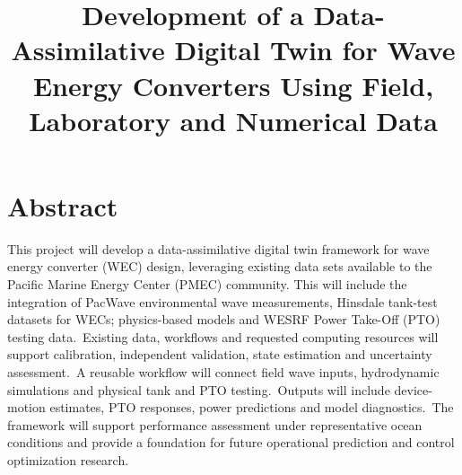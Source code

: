 \documentclass[11pt]{article}
\title{Development of a Data-Assimilative Digital Twin for Wave Energy Converters Using Field, Laboratory and Numerical Data}
\date{}
\begin{document}
\maketitle{}

\section*{Abstract}
This project will develop a data-assimilative digital twin framework for wave energy converter (WEC) design, leveraging existing data sets available to the Pacific Marine Energy Center (PMEC) community. This will include the integration of PacWave environmental wave measurements, Hinsdale tank-test datasets for WECs; physics-based models and WESRF Power Take-Off (PTO) testing data.~Existing data, workflows and requested computing resources will support calibration, independent validation, state estimation and uncertainty assessment.~A reusable workflow will connect field wave inputs, hydrodynamic simulations and physical tank and PTO testing.~Outputs will include device-motion estimates, PTO responses, power predictions and model diagnostics.~The framework will support performance assessment under representative ocean conditions and provide a foundation for future operational prediction and control optimization research.
\end{document}
